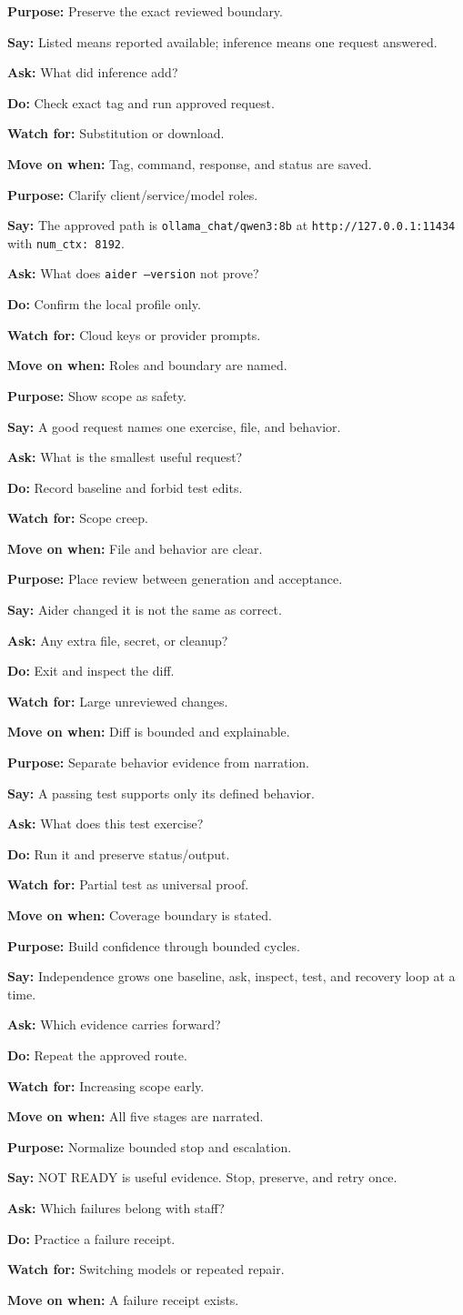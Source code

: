 \documentclass[11pt]{article}
\newcommand{\field}[2]{\textbf{\color{blue}#1:} #2\par}
\begin{document}
\field{Purpose}{Preserve the exact reviewed boundary.}\field{Say}{Listed means reported available; inference means one request answered.}\field{Ask}{What did inference add?}\field{Do}{Check exact tag and run approved request.}\field{Watch for}{Substitution or download.}\field{Move on when}{Tag, command, response, and status are saved.}
\field{Purpose}{Clarify client/service/model roles.}\field{Say}{The approved path is \texttt{ollama\_chat/qwen3:8b} at \texttt{http://127.0.0.1:11434} with \texttt{num\_ctx: 8192}.}\field{Ask}{What does \texttt{aider --version} not prove?}\field{Do}{Confirm the local profile only.}\field{Watch for}{Cloud keys or provider prompts.}\field{Move on when}{Roles and boundary are named.}
\field{Purpose}{Show scope as safety.}\field{Say}{A good request names one exercise, file, and behavior.}\field{Ask}{What is the smallest useful request?}\field{Do}{Record baseline and forbid test edits.}\field{Watch for}{Scope creep.}\field{Move on when}{File and behavior are clear.}
\field{Purpose}{Place review between generation and acceptance.}\field{Say}{Aider changed it is not the same as correct.}\field{Ask}{Any extra file, secret, or cleanup?}\field{Do}{Exit and inspect the diff.}\field{Watch for}{Large unreviewed changes.}\field{Move on when}{Diff is bounded and explainable.}
\field{Purpose}{Separate behavior evidence from narration.}\field{Say}{A passing test supports only its defined behavior.}\field{Ask}{What does this test exercise?}\field{Do}{Run it and preserve status/output.}\field{Watch for}{Partial test as universal proof.}\field{Move on when}{Coverage boundary is stated.}
\field{Purpose}{Build confidence through bounded cycles.}\field{Say}{Independence grows one baseline, ask, inspect, test, and recovery loop at a time.}\field{Ask}{Which evidence carries forward?}\field{Do}{Repeat the approved route.}\field{Watch for}{Increasing scope early.}\field{Move on when}{All five stages are narrated.}
\field{Purpose}{Normalize bounded stop and escalation.}\field{Say}{NOT READY is useful evidence. Stop, preserve, and retry once.}\field{Ask}{Which failures belong with staff?}\field{Do}{Practice a failure receipt.}\field{Watch for}{Switching models or repeated repair.}\field{Move on when}{A failure receipt exists.}
\end{document}
